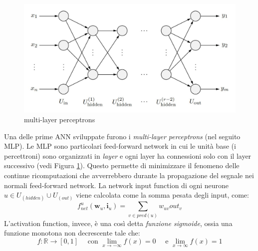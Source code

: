 \documentclass[10pt,a4paper]{article}
\newcommand{\ww}{\mathbf{w}}
\newcommand{\ii}{\mathbf{i}}
\begin{document}
\begin{figure}
\centering
\includegraphics[scale=0.3]{img/MLP.png}
\caption{multi-layer perceptrons}
\label{fig:9}
\end{figure}


Una delle prime ANN sviluppate furono i \emph{multi-layer perceptrons} (nel seguito MLP). Le MLP sono particolari feed-forward network  in cui le unità base (i percettroni) sono organizzati in \emph{layer} e ogni layer ha connessioni solo con il layer successivo (vedi Figura \ref{fig:9}). Questo permette di minimizzare il fenomeno delle continue ricomputazioni che avverrebbero durante la propagazione del segnale nei normali feed-forward network.
La network input function di ogni neurone $u \in U_{(hidden)} \cup U_{(out)}$ viene calcolata come la somma pesata degli input, come:
$$
f^u_{net}(\ww_u,\ii_u) = \sum_{v \in pred(u)} w_{uv}out_v
$$
L'activation function, invece, è una così detta \emph{funzione sigmoide}, ossia una funzione monotona non decrescente tale che:
$$
f: \mathbb{R} \to [0,1] \quad \text{ con } \lim_{x\to-\infty}f(x) = 0 \quad \text{ e } \lim_{x\to\infty}f(x) = 1
$$
\end{document}
